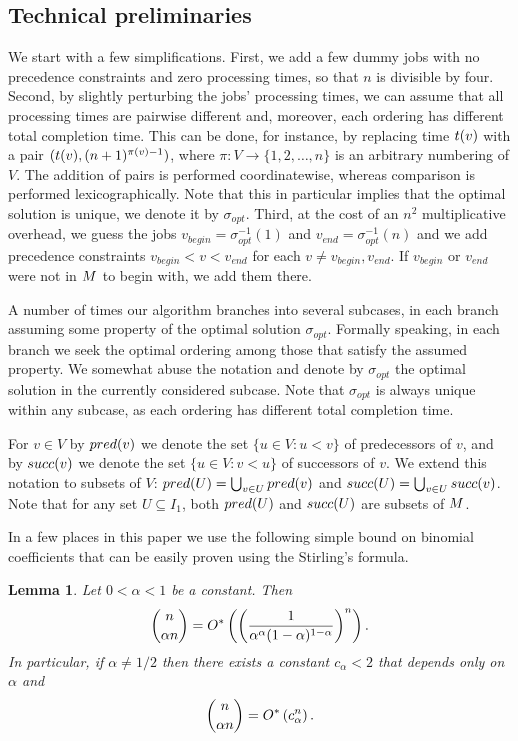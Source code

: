 \documentclass{article}
\newtheorem{lemma}[theorem]{Lemma}
\theoremstyle{definition}
\begin{document}
\subsection{Technical preliminaries}\label{sec:init}
We start with a few simplifications.
First, we add a few dummy jobs with no precedence constraints and zero processing times, so that $n$ is divisible by four.
Second, by slightly perturbing the jobs' processing times, we can assume
that all processing times are pairwise different and, moreover, each ordering has different total completion time.
This can be done, for instance, by replacing time $t(v)$ with a pair $(t(v), (n+1)^{\pi(v)-1})$,
where $\pi:V \to \{1,2,\ldots,n\}$ is an arbitrary numbering of $V$. The addition of pairs is performed coordinatewise,
whereas comparison is performed lexicographically.
Note that this in particular implies that the optimal solution is unique, we denote it by $\sigma_{opt}$.
Third, at the cost of an $n^2$ multiplicative overhead,
we guess the jobs $v_{begin} = \sigma_{opt}^{-1}(1)$ and $v_{end}=\sigma_{opt}^{-1}(n)$
and we add precedence constraints $v_{begin} < v < v_{end}$ for each $v \neq v_{begin},v_{end}$.
If $v_{begin}$ or $v_{end}$ were not in $M$ to begin with, we add them there.

A number of times our algorithm branches into several subcases, in each branch assuming some property
of the optimal solution $\sigma_{opt}$. Formally speaking, in each branch we seek the optimal ordering
among those that satisfy the assumed property. We somewhat abuse the notation and denote by $\sigma_{opt}$
the optimal solution in the currently considered subcase.
Note that $\sigma_{opt}$ is always unique within any subcase, as each ordering
has different total completion time.

For $v \in V$ by ${pred}(v)$ we denote the set $\{u \in V : u < v\}$
of predecessors of $v$,
and by ${succ}(v)$ we denote the set $\{u \in V : v < u\}$ of successors of $v$.
We extend this notation to subsets of $V$: ${pred}(U) = \bigcup_{v \in U} {pred}(v)$
and ${succ}(U) = \bigcup_{v \in U}{succ}(v)$.
Note that for any set $U \subseteq I_1$, both ${pred}(U)$ and ${succ}(U)$ are subsets of $M$.

In a few places in this paper we use the following simple bound on binomial coefficients
that can be easily proven using the Stirling's formula.
\begin{lemma}\label{lem:binom}
Let $0 < \alpha < 1$ be a constant. Then
$$\binom{n}{\alpha n} = O^\ast\left( \left(\frac{1}{\alpha^\alpha (1-\alpha)^{1-\alpha}}\right)^n \right).$$
In particular, if $\alpha \neq 1/2$ then there exists a constant $c_\alpha < 2$
that depends only on $\alpha$ and
$$\binom{n}{\alpha n} = O^\ast\left(c_\alpha^n\right).$$
\end{lemma}
\end{document}
